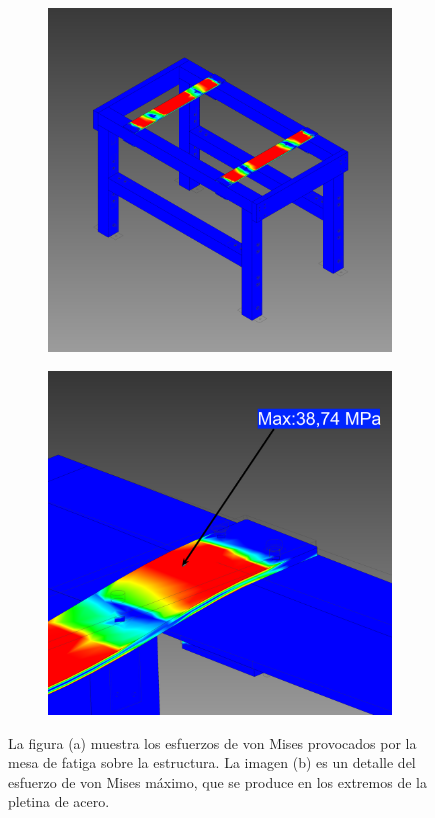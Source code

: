 \begin{figure}[h]
\centering
	\begin{subfigure}{0.49\linewidth}
		\centering
		\includegraphics[width=1\linewidth]{Imagenes/rmesa_gen.png}
		\caption{}\label{fig:rmesa_gen}
	\end{subfigure}%
	\begin{subfigure}{0.49\linewidth}
		\centering
		\includegraphics[width=1\linewidth]{Imagenes/rmesa_det.png}
		\caption{}\label{fig:rmesa_det}
	\end{subfigure}
\caption{La figura (a) muestra los esfuerzos de von Mises provocados por la mesa de fatiga sobre la estructura. La imagen (b) es un detalle del esfuerzo de von Mises máximo, que se produce en los extremos de la pletina de acero.}
\label{fig:resultados_mesa}
\end{figure}
